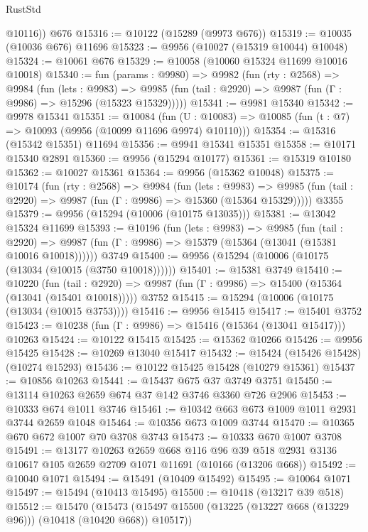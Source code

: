 \begin{lexlean}{RustStd}
\begin{coremodule}
        @10116))
    @676
@15316 := @10122 (@15289 (@9973 @676))
@15319 := @10035 (@10036 @676) @11696
@15323 := @9956 (@10027 (@15319 @10044) @10048)
@15324 := @10061 @676
@15329 := @10058 (@10060 @15324 @11699 @10016 @10018)
@15340 := fun (params : @9980) =>
  @9982
    (fun (rty : @2568) =>
    @9984
      (fun (lets : @9983) =>
      @9985 (fun (tail : @2920) => @9987 (fun (Γ : @9986) => @15296 (@15323 @15329)))))
@15341 := @9981 @15340
@15342 := @9978 @15341
@15351 := @10084
    (fun (U : @10083) => @10085 (fun (t : @7) => @10093 (@9956 (@10099 @11696 @9974) @10110)))
@15354 := @15316 (@15342 @15351) @11694
@15356 := @9941 @15341 @15351
@15358 := @10171 @15340 @2891
@15360 := @9956 (@15294 @10177)
@15361 := @15319 @10180
@15362 := @10027 @15361
@15364 := @9956 (@15362 @10048)
@15375 := @10174
    (fun (rty : @2568) =>
    @9984
      (fun (lets : @9983) =>
      @9985 (fun (tail : @2920) => @9987 (fun (Γ : @9986) => @15360 (@15364 @15329)))))
    @3355
@15379 := @9956 (@15294 (@10006 (@10175 @13035)))
@15381 := @13042 @15324 @11699
@15393 := @10196
    (fun (lets : @9983) =>
    @9985
      (fun (tail : @2920) =>
      @9987 (fun (Γ : @9986) => @15379 (@15364 (@13041 (@15381 @10016 @10018))))))
    @3749
@15400 := @9956 (@15294 (@10006 (@10175 (@13034 (@10015 (@3750 @10018))))))
@15401 := @15381 @3749
@15410 := @10220
    (fun (tail : @2920) => @9987 (fun (Γ : @9986) => @15400 (@15364 (@13041 (@15401 @10018)))))
    @3752
@15415 := @15294 (@10006 (@10175 (@13034 (@10015 @3753))))
@15416 := @9956 @15415
@15417 := @15401 @3752
@15423 := @10238 (fun (Γ : @9986) => @15416 (@15364 (@13041 @15417))) @10263
@15424 := @10122 @15415
@15425 := @15362 @10266
@15426 := @9956 @15425
@15428 := @10269 @13040 @15417
@15432 := @15424 (@15426 @15428) (@10274 @15293)
@15436 := @10122 @15425 @15428 (@10279 @15361)
@15437 := @10856 @10263
@15441 := @15437 @675 @37 @3749 @3751
@15450 := @13114 @10263 @2659 @674 @37 @142 @3746 @3360 @726 @2906
@15453 := @10333 @674 @1011 @3746
@15461 := @10342 @663 @673 @1009 @1011 @2931 @3744 @2659 @1048
@15464 := @10356 @673 @1009 @3744
@15470 := @10365 @670 @672 @1007 @70 @3708 @3743
@15473 := @10333 @670 @1007 @3708
@15491 := @13177
    @10263
    @2659
    @668
    @116
    @96
    @39
    @518
    @2931
    @3136
    @10617
    @105
    @2659
    @2709
    @1071
    @11691
    (@10166 (@13206 @668))
@15492 := @10040 @1071
@15494 := @15491 (@10409 @15492)
@15495 := @10064 @1071
@15497 := @15494 (@10413 @15495)
@15500 := @10418 (@13217 @39 @518)
@15512 := @15470
    (@15473 (@15497 @15500 (@13225 (@13227 @668 (@13229 @96))) (@10418 (@10420 @668)) @10517))

\end{coremodule}
\end{lexlean}
